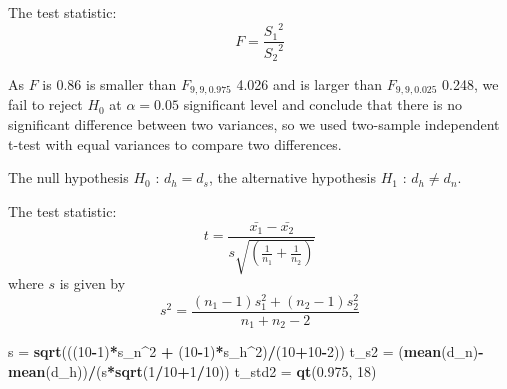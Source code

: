 \documentclass[]{article}
\newenvironment{Shaded}{\begin{snugshade}}{\end{snugshade}}
\newcommand{\KeywordTok}[1]{\textcolor[rgb]{0.13,0.29,0.53}{\textbf{#1}}}
\newcommand{\DecValTok}[1]{\textcolor[rgb]{0.00,0.00,0.81}{#1}}
\newcommand{\FloatTok}[1]{\textcolor[rgb]{0.00,0.00,0.81}{#1}}
\newcommand{\StringTok}[1]{\textcolor[rgb]{0.31,0.60,0.02}{#1}}
\newcommand{\CommentTok}[1]{\textcolor[rgb]{0.56,0.35,0.01}{\textit{#1}}}
\newcommand{\OperatorTok}[1]{\textcolor[rgb]{0.81,0.36,0.00}{\textbf{#1}}}
\newcommand{\NormalTok}[1]{#1}
\begin{document}
The test statistic: \[ F=\frac{{S_1}^2}{{S_2}^2} \]

\begin{Shaded}
\end{Shaded}

As \(F\) is 0.86 is smaller than \(F_{9,9,0.975}\) 4.026 and is larger
than \(F_{9,9,0.025}\) 0.248, we fail to reject \(H_0\) at
\(\alpha = 0.05\) significant level and conclude that there is no
significant difference between two variances, so we used two-sample
independent t-test with equal variances to compare two differences.

The null hypothesis \(H_0\) : \(d_h = d_s\), the alternative hypothesis
\(H_1\) : \(d_h \neq d_n\).

The test statistic:
\[ t = \frac{\bar{x_1}-\bar{x_2}}{s\sqrt{(\frac{1}{n_1}+\frac{1}{n_2})}} \]
where \(s\) is given by
\[ s^2=\frac{(n_1-1)s_1^2+(n_2-1)s_2^2}{n_1+n_2-2} \]

\begin{Shaded}
\begin{Highlighting}[]
\NormalTok{s =}\StringTok{ }\KeywordTok{sqrt}\NormalTok{(((}\DecValTok{10}\OperatorTok{-}\DecValTok{1}\NormalTok{)}\OperatorTok{*}\NormalTok{s_n}\OperatorTok{^}\DecValTok{2} \OperatorTok{+}\StringTok{ }\NormalTok{(}\DecValTok{10}\OperatorTok{-}\DecValTok{1}\NormalTok{)}\OperatorTok{*}\NormalTok{s_h}\OperatorTok{^}\DecValTok{2}\NormalTok{)}\OperatorTok{/}\NormalTok{(}\DecValTok{10}\OperatorTok{+}\DecValTok{10}\OperatorTok{-}\DecValTok{2}\NormalTok{))}
\NormalTok{t_s2 =}\StringTok{ }\NormalTok{(}\KeywordTok{mean}\NormalTok{(d_n)}\OperatorTok{-}\KeywordTok{mean}\NormalTok{(d_h))}\OperatorTok{/}\NormalTok{(s}\OperatorTok{*}\KeywordTok{sqrt}\NormalTok{(}\DecValTok{1}\OperatorTok{/}\DecValTok{10}\OperatorTok{+}\DecValTok{1}\OperatorTok{/}\DecValTok{10}\NormalTok{))}
\NormalTok{t_std2 =}\StringTok{ }\KeywordTok{qt}\NormalTok{(}\FloatTok{0.975}\NormalTok{, }\DecValTok{18}\NormalTok{)}
\end{Highlighting}
\end{Shaded}
\end{document}
